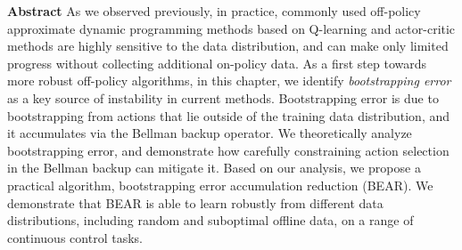 \documentclass[../thesis.tex]{subfiles}
\begin{document}

\vspace{-0.4cm}
\begin{AIbox}{\large{\textbf{Abstract}}}
\vspace{4mm}
As we observed previously, in practice, commonly used off-policy approximate dynamic programming methods based on Q-learning and actor-critic methods are highly sensitive to the data distribution, and can make only limited progress without collecting additional on-policy data. As a first step towards more robust off-policy algorithms, in this chapter, we identify \emph{bootstrapping error} as a key source of instability in current methods. Bootstrapping error is due to bootstrapping from actions that lie outside of the training data distribution, and it accumulates via the Bellman backup operator. We theoretically analyze bootstrapping error, and demonstrate how carefully constraining action selection in the Bellman backup can mitigate it. Based on our analysis, we propose a practical algorithm, bootstrapping error accumulation reduction (BEAR). We demonstrate that BEAR is able to learn robustly from different data distributions, including random and suboptimal offline data, on a range of continuous control tasks.

\end{AIbox}
\end{document}
